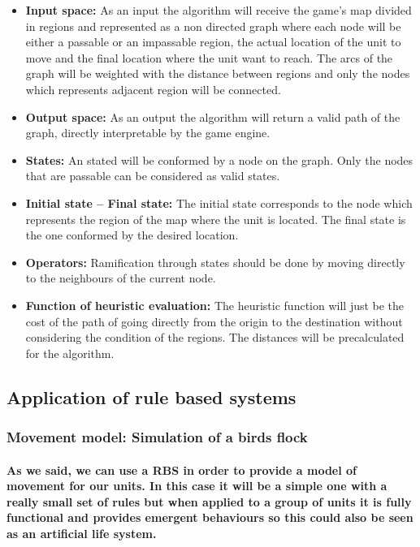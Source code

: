 \documentclass[a4paper,10pt]{article}
\newcommand{\p}[1]{\paragraph{\indent\textnormal{#1}}}
\begin{document}
    \begin{itemize}
     \item \textbf{Input space:} As an input the algorithm will receive the game's map divided in regions and represented as a non directed graph where each node will be either a passable or an impassable region, the actual location of the unit to move and the final location where the unit want to reach. The arcs of the graph will be weighted with the distance between regions and only the nodes which represents adjacent region will be connected.
     \item \textbf{Output space:} As an output the algorithm will return a valid path of the graph, directly interpretable by the game engine.
     \item \textbf{States:} An stated will be conformed by a node on the graph. Only the nodes that are passable can be considered as valid states. 
     \item \textbf{Initial state – Final state:} The initial state corresponds to the node which represents the region of the map where the unit is located. The final state is the one conformed by the desired location.
     \item \textbf{Operators:} Ramification through states should be done by moving directly to the neighbours of the current node.
     \item \textbf{Function of heuristic evaluation:} The heuristic function will just be the cost of the path of going directly from the origin to the destination without considering the condition of the regions. The distances will be precalculated for the algorithm.
    \end{itemize}

  \subsection{Application of rule based systems}
  
    \subsubsection{Movement model: Simulation of a birds flock}

      \p{As we said, we can use a RBS in order to provide a model of movement for our units. In this case it will be a simple one with a really small set of rules but when applied to a group of units it is fully functional and provides emergent behaviours so this could also be seen as an \textbf{artificial life} system.}
\end{document}
